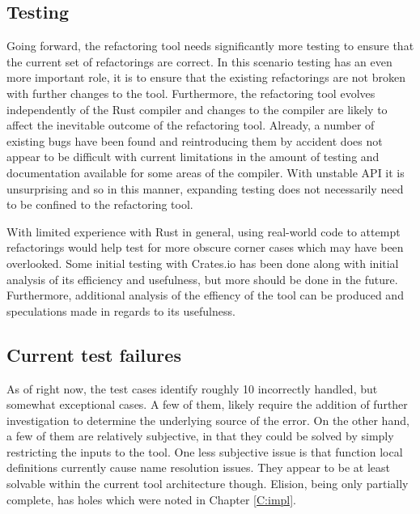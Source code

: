 \subsection{Testing}
Going forward, the refactoring tool needs significantly more testing to ensure that the current set of refactorings are correct. In this scenario testing has an even more important role, it is to ensure that the existing refactorings are not broken with further changes to the tool. Furthermore, the refactoring tool evolves independently of the Rust compiler and changes to the compiler are likely to affect the inevitable outcome of the refactoring tool. Already, a number of existing bugs have been found and reintroducing them by accident does not appear to be difficult with current limitations in the amount of testing and documentation available for some areas of the compiler. With unstable API it is unsurprising and so in this manner, expanding testing does not necessarily need to be confined to the refactoring tool. 


With limited experience with Rust in general, using real-world code to attempt refactorings would help test for more obscure corner cases which may have been overlooked. Some initial testing with Crates.io \cite{cratesio15} has been done along with initial analysis of its efficiency and usefulness, but more should be done in the future. Furthermore, additional analysis of the effiency of the tool can be produced and speculations made in regards to its usefulness. 


\subsection{Current test failures}
As of right now, the test cases identify roughly 10 incorrectly handled, but somewhat exceptional cases. A few of them, likely require the addition of further investigation to determine the underlying source of the error. On the other hand, a few of them are relatively subjective, in that they could be solved by simply restricting the inputs to the tool. One less subjective issue is that function local definitions currently cause name resolution issues. They appear to be at least solvable within the current tool architecture though. Elision, being only partially complete, has holes which were noted in Chapter \ref{C:impl}.

